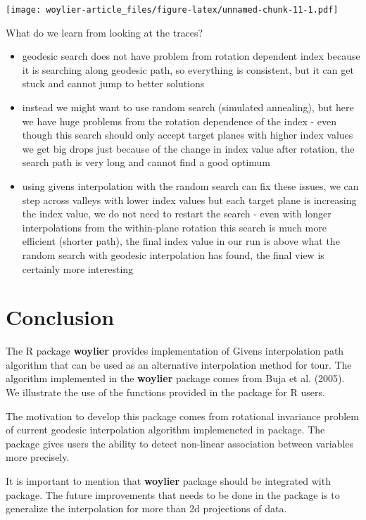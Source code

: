 \texttt{[image: woylier-article\_files/figure-latex/unnamed-chunk-11-1.pdf]}

What do we learn from looking at the traces?

\begin{itemize}
\tightlist
\item
  geodesic search does not have problem from rotation dependent index because it is searching along geodesic path, so everything is consistent, but it can get stuck and cannot jump to better solutions
\item
  instead we might want to use random search (simulated annealing), but here we have huge problems from the rotation dependence of the index - even though this search should only accept target planes with higher index values we get big drops just because of the change in index value after rotation, the search path is very long and cannot find a good optimum
\item
  using givens interpolation with the random search can fix these issues, we can step across valleys with lower index values but each target plane is increasing the index value, we do not need to restart the search - even with longer interpolations from the within-plane rotation this search is much more efficient (shorter path), the final index value in our run is above what the random search with geodesic interpolation has found, the final view is certainly more interesting
\end{itemize}

\hypertarget{conclusion}{%
\section{Conclusion}\label{conclusion}}

The R package \textbf{woylier} provides implementation of Givens interpolation path algorithm that can be used as an alternative interpolation method for tour. The algorithm implemented in the \textbf{woylier} package comes from Buja et al. (2005). We illustrate the use of the functions provided in the package for R users.

The motivation to develop this package comes from rotational invariance problem of current geodesic interpolation algorithm implemeneted in  package. The package gives users the ability to detect non-linear association between variables more precisely.

It is important to mention that \textbf{woylier} package should be integrated with  package. The future improvements that needs to be done in the package is to generalize the interpolation for more than 2d projections of data.

